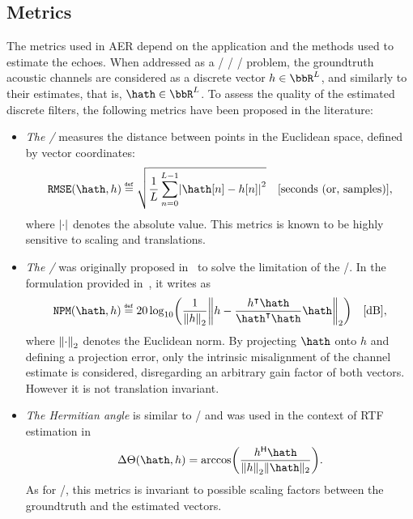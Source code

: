 \subsection{Metrics}\label{subsec:estimation:metrics}
The metrics used in \ac{AER} depend on the application and the methods used to estimate the echoes.
When addressed as a \FIR/ \SIMO/ \BCE/ problem, the groundtruth acoustic channels are considered as a discrete vector $h \in \bbR^L$, and similarly to their estimates, that is, $\hath \in \bbR^L$.
To assess the quality of the estimated discrete filters, the following metrics have been proposed in the literature:
\begin{itemize}
    \item \textit{The \RMSEtxt/}  measures the distance between points in the Euclidean space, defined by vector coordinates:
    \begin{equation}
        \RMSE(\hath, h) \eqdef \sqrt{ \frac{1}{L} \sum_{n=0}^{L-1} \abs{\hath[n] - h[n]}^2} \quad \text{[seconds (or, samples)]}
        ,
    \end{equation}
    where $\abs{\cdot}$ denotes the absolute value.
    This metrics is known to be highly sensitive to scaling and translations.

    \item \textit{The \NPMtxt/}  was originally proposed in~ to solve the limitation of the \RMSEtxt/.
    In the formulation provided in~, it writes as
    \begin{equation}
        \NPM(\hath,h) \eqdef 20 \log_{10} \kparen{ \frac{1}{\norm{h}_2} \norm{h - \frac{\ktranspose{h}\hath}{\ktranspose{\hath} \hath} \hath}_2} \quad \text{[dB]}
        ,
    \end{equation}
    where $\norm{\cdot}_2$ denotes the Euclidean norm.
    By projecting $\hath$ onto $h$ and defining a projection error, only the intrinsic misalignment of the channel estimate is considered, disregarding an arbitrary gain factor of both vectors.
    However it is not translation invariant.

    \item \textit{The Hermitian angle} is similar to \NPMtxt/ and was used in the context of RTF estimation in~
    \begin{equation}
        \Delta\Theta(\hath,h) = \arccos\kparen{\frac{\khermitian{h}\hath}{\norm{h}_2\|\hath\|_2}}
        .
    \end{equation}
    As for \NPMtxt/, this metrics is invariant to possible scaling factors between the groundtruth and the estimated vectors.
\end{itemize}

